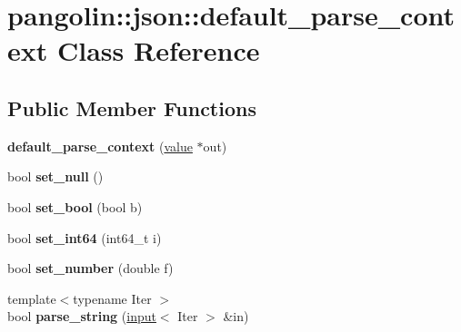 \hypertarget{classpangolin_1_1json_1_1default__parse__context}{}\section{pangolin\+:\+:json\+:\+:default\+\_\+parse\+\_\+context Class Reference}
\label{classpangolin_1_1json_1_1default__parse__context}
\subsection*{Public Member Functions}
\begin{DoxyCompactItemize}
\item 
{\bfseries default\+\_\+parse\+\_\+context} (\hyperlink{classpangolin_1_1json_1_1value}{value} $\ast$out)\hypertarget{classpangolin_1_1json_1_1default__parse__context_af59330f5b348a80b439fc8648232a546}{}\label{classpangolin_1_1json_1_1default__parse__context_af59330f5b348a80b439fc8648232a546}

\item 
bool {\bfseries set\+\_\+null} ()\hypertarget{classpangolin_1_1json_1_1default__parse__context_a609c175a7e6cfd099f526c08cd74789a}{}\label{classpangolin_1_1json_1_1default__parse__context_a609c175a7e6cfd099f526c08cd74789a}

\item 
bool {\bfseries set\+\_\+bool} (bool b)\hypertarget{classpangolin_1_1json_1_1default__parse__context_a92fabad12ec7f727c0af7f7a14fa54df}{}\label{classpangolin_1_1json_1_1default__parse__context_a92fabad12ec7f727c0af7f7a14fa54df}

\item 
bool {\bfseries set\+\_\+int64} (int64\+\_\+t i)\hypertarget{classpangolin_1_1json_1_1default__parse__context_ab4bb62ffdd61ec9378870bff1ef416c4}{}\label{classpangolin_1_1json_1_1default__parse__context_ab4bb62ffdd61ec9378870bff1ef416c4}

\item 
bool {\bfseries set\+\_\+number} (double f)\hypertarget{classpangolin_1_1json_1_1default__parse__context_ace5c22bd3d74dc4d17c6bdb9d410b5ff}{}\label{classpangolin_1_1json_1_1default__parse__context_ace5c22bd3d74dc4d17c6bdb9d410b5ff}

\item 
{\footnotesize template$<$typename Iter $>$ }\\bool {\bfseries parse\+\_\+string} (\hyperlink{classpangolin_1_1json_1_1input}{input}$<$ Iter $>$ \&in)\hypertarget{classpangolin_1_1json_1_1default__parse__context_af34add1ffd031f8ebd02fa5bfb631657}{}\label{classpangolin_1_1json_1_1default__parse__context_af34add1ffd031f8ebd02fa5bfb631657}


\end{DoxyCompactItemize}
